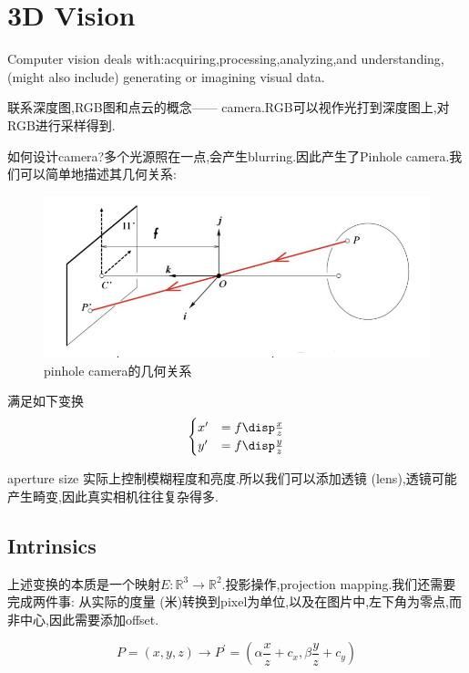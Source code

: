 \section{3D Vision}

Computer vision deals with:acquiring,processing,analyzing,and understanding,(might also include) 
generating or imagining visual data.

联系深度图,RGB图和点云的概念------ camera.RGB可以视作光打到深度图上,对RGB进行采样得到.

如何设计camera?多个光源照在一点,会产生blurring.因此产生了Pinhole camera.我们可以简单地描述其几何关系:
\begin{figure}[htbp]
	\centering
	\includegraphics[scale=0.65]{figures/pinholecamera.png}
	\caption{pinhole camera的几何关系}
\end{figure}

满足如下变换
\begin{equation}
	\begin{cases}
		x^\prime &= f\disp\frac{x}{z}
		\\
		y^\prime &= f\disp\frac{y}{z}
	\end{cases}
\end{equation}

aperture size 实际上控制模糊程度和亮度.所以我们可以添加透镜 (lens),透镜可能产生畸变,因此真实相机往往复杂得多.

\subsection{Intrinsics}

上述变换的本质是一个映射$E: \mathbb{R}^3 \to \mathbb R^2$.投影操作,projection mapping.我们还需要完成两件事:
从实际的度量 (米)转换到pixel为单位,以及在图片中,左下角为零点,而非中心,因此需要添加offset.

\begin{equation}
	P=(x, y, z) \rightarrow P^{\prime}=\left(\alpha \frac{x}{z}+c_{x}, \beta \frac{y}{z}+c_{y}\right)
\end{equation}

